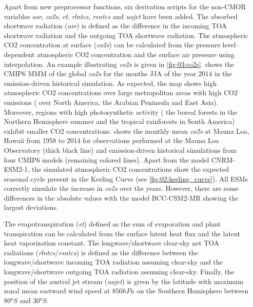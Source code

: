 Apart from new preprocessor functions, six derivation scripts for the
non-\ac{CMOR} variables \emph{asr}, \emph{co2s}, \emph{et}, \emph{rlntcs},
\emph{rsntcs} and \emph{uajet} have been added. The absorbed shortwave
radiation (\emph{asr}) is defined as the difference in the incoming \ac{TOA}
shortwave radiation and the outgoing \ac{TOA} shortwave radiation. The
atmospheric \ac{CO2} concentration at surface (\emph{co2s}) can be calculated
from the pressure level--dependent atmospheric \ac{CO2} concentration and the
surface air pressure using interpolation. An example illustrating \emph{co2s}
is given in \cref{fig:03:co2s}.  shows the \acs{CMIP}6
\ac{MMM} of the global \emph{co2s} for the months \acf{JJA} of the year 2014 in
the emission-driven historical simulation. As expected, the map shows high
atmospheric \ac{CO2} concentrations over large metropolitan areas with high
\ac{CO2} emissions (\eg{} over North America, the Arabian Peninsula and East
Asia). Moreover, regions with high photosynthetic activity (\eg{} the boreal
forests in the Northern Hemisphere summer and the tropical rainforests in South
America) exhibit smaller \ac{CO2} concentrations.  shows
the monthly mean \emph{co2s} at Mauna Loa, Hawaii from 1958 to 2014 for
observations performed at the Mauna Loa Observatory \autocite{Keeling2005}
(thick black line) and emission-driven historical simulations from four
\acs{CMIP}6 models (remaining colored lines). Apart from the model CNRM-ESM2-1,
the simulated atmospheric \ac{CO2} concentrations show the expected seasonal
cycle present in the Keeling Curve (see \cref{fig:02:keeling_curve}). All
\acp{ESM} correctly simulate the increase in \emph{co2s} over the years.
However, there are some differences in the absolute values with the model
BCC-CSM2-MR showing the largest deviations.

The evapotranspiration (\emph{et}) defined as the sum of evaporation and plant
transpiration can be calculated from the surface latent heat flux and the
latent heat vaporization constant. The longwave/shortwave clear-sky net
\acf{TOA} radiations (\emph{rlntcs}/\emph{rsntcs}) is defined as the difference
between the longwave/shortwave incoming \ac{TOA} radiation assuming clear-sky
and the longwave/shortwave outgoing \ac{TOA} radiation assuming clear-sky.
Finally, the position of the austral jet stream (\emph{uajet}) is given by the
latitude with maximum zonal mean eastward wind speed at $850 \unit{hPa}$ on the
Southern Hemisphere between $80 \unit{\degree S}$ and $30 \unit{\degree S}$.


